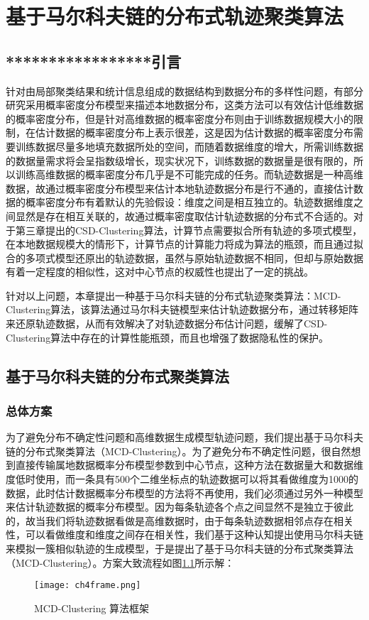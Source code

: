\chapter{基于马尔科夫链的分布式轨迹聚类算法}


\section{*****************引言}
针对由局部聚类结果和统计信息组成的数据结构到数据分布的多样性问题，有部分研究采用概率密度分布模型来描述本地数据分布，这类方法可以有效估计低维数据的概率密度分布，但是针对高维数据的概率密度分布则由于训练数据规模大小的限制，在估计数据的概率密度分布上表示很差，这是因为估计数据的概率密度分布需要训练数据尽量多地填充数据所处的空间，而随着数据维度的增大，所需训练数据的数据量需求将会呈指数级增长，现实状况下，训练数据的数据量是很有限的，所以训练高维数据的概率密度分布几乎是不可能完成的任务。而轨迹数据是一种高维数据，故通过概率密度分布模型来估计本地轨迹数据分布是行不通的，直接估计数据的概率密度分布有着默认的先验假设：维度之间是相互独立的。轨迹数据维度之间显然是存在相互关联的，故通过概率密度取估计轨迹数据的分布式不合适的。对于第三章提出的CSD-Clustering算法，计算节点需要拟合所有轨迹的多项式模型，在本地数据规模大的情形下，计算节点的计算能力将成为算法的瓶颈，而且通过拟合的多项式模型还原出的轨迹数据，虽然与原始轨迹数据不相同，但却与原始数据有着一定程度的相似性，这对中心节点的权威性也提出了一定的挑战。

针对以上问题，本章提出一种基于马尔科夫链的分布式轨迹聚类算法：MCD-Clustering算法，该算法通过马尔科夫链模型来估计轨迹数据分布，通过转移矩阵来还原轨迹数据，从而有效解决了对轨迹数据分布估计问题，缓解了CSD-Clustering算法中存在的计算性能瓶颈，而且也增强了数据隐私性的保护。

\section{基于马尔科夫链的分布式聚类算法}

\subsection{总体方案}
为了避免分布不确定性问题和高维数据生成模型轨迹问题，我们提出基于马尔科夫链的分布式聚类算法（MCD-Clustering）。为了避免分布不确定性问题，很自然想到直接传输属地数据概率分布模型参数到中心节点，这种方法在数据量大和数据维度低时使用，而一条具有500个二维坐标点的轨迹数据可以将其看做维度为1000的数据，此时估计数据概率分布模型的方法将不再使用，我们必须通过另外一种模型来估计轨迹数据的概率分布模型。因为每条轨迹各个点之间显然不是独立于彼此的，故当我们将轨迹数据看做是高维数据时，由于每条轨迹数据相邻点存在相关性，可以看做维度和维度之间存在相关性，我们基于这种认知提出使用马尔科夫链来模拟一簇相似轨迹的生成模型，于是提出了基于马尔科夫链的分布式聚类算法（MCD-Clustering）。方案大致流程如图\ref{ch4frame}所示解：
\begin{figure}[h]
	\texttt{[image: ch4frame.png]}
	\caption{MCD-Clustering 算法框架}
	\label{ch4frame}
\end{figure}

